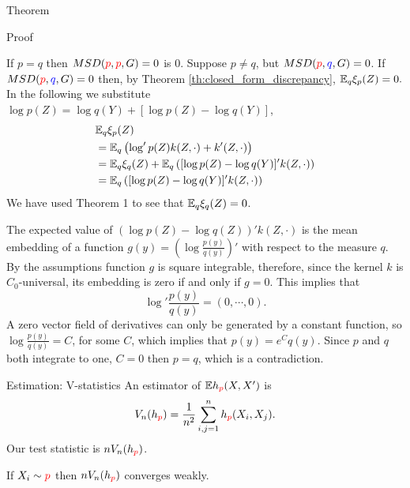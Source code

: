 \begin{frame}
\begin{columns}
\begin{column}{.33\linewidth}
\begin{block}{Theorem}
\end{block}

\vspace{-0.75cm}
\begin{block}{Proof}

 If $p=q$ then $MSD({\color{red} p},{ \color{red} p},G) =0$ is $0$. Suppose
$p\neq q$, but $MSD({\color{red} p},{ \color{blue} q},G) =0$. If $MSD({\color{red} p},{ \color{blue} q},G) =0$ then, by Theorem \ref{th:closed_form_discrepancy},
$\mathbb{E}_{q}\xi_{p}(Z)=0.$ In the following we substitute $\log p(Z)=\log q(Y)+[\log p(Z)-\log q(Y)]$,
\begin{align*}
 & \mathbb{E}_{q}\xi_{p}(Z)\\
 & =\mathbb{E}_{q}\left( \log' p(Z)k(Z,\cdot)+ k'(Z,\cdot)\right)\\
 & =\mathbb{E}_{q}\xi_{q}(Z)+\mathbb{E}_{q}\left([\log p(Z)-\log q(Y)]'k(Z,\cdot)\right)\\
 & =\mathbb{E}_{q}\left( [\log p(Z)-\log q(Y)]' k(Z,\cdot)\right)
\end{align*}
We have used Theorem 1 to see that $\mathbb{E}_{q}\xi_{q}(Z)=0$. 

The expected value of $(\log p(Z)-\log q(Z))' k(Z,\cdot)$ is the mean embedding of
a function $g(y)=\left(\log\frac{p(y)}{q(y)}\right)'$ with respect
to the measure $q$. By the assumptions function $g$ is square integrable,
therefore, since the kernel $k$ is $C_0$-universal, %
its embedding is zero if and only if $g=0$. This implies that 
\[
\log'\frac{p(y)}{q(y)}=(0,\cdots,0).
\]
A zero vector field of derivatives can only be generated by a
constant function, so $\log\frac{p(y)}{q(y)}=C$, for some $C$, which
implies that $p(y)=e^{C}q(y)$. Since $p$ and $q$ both integrate
to one, $C=0$ then $p=q$, which is a contradiction.
\end{block}


\vspace{-0.75cm}
\begin{block}{Estimation: V-statistics}
An estimator of $\mathbb{E} h_{\color{red} p}(X,X')$ is
\begin{align*}
 V_n(h_{\color{red} p}) = \frac {1} {n^2} \sum_{i,j=1}^n h_{\color{red} p}(X_i,X_j).
\end{align*}
Our test statistic is $ n V_n(h_{\color{red} p})$.

If $X_i \sim {\color{red} p}$ then $ n V_n(h_{\color{red} p})$  converges weakly. 


\end{block}
\end{column}
\end{columns}
\end{frame}
